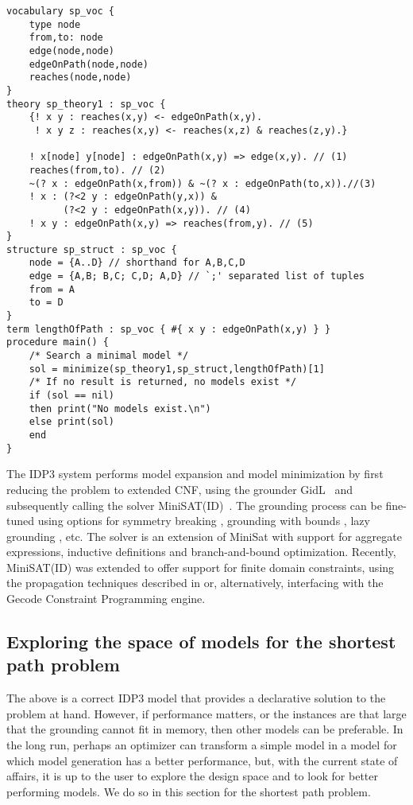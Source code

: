 \documentclass{tlp}
\newcommand{\idpdrie}{{\sc IDP3}\xspace}
\newcommand{\minisatid}{{\sc MiniSAT(ID)}\xspace}
\newcommand{\gidl}{{\sc GidL}\xspace}
\renewcommand{\|}{\ensuremath{\,|\,}}
\renewcommand{\|}{\,|\,}
\begin{document}
\begin{lstlisting}[caption={Calling main() solves the shortest path problem for the given data.},label={shortestpath}]
vocabulary sp_voc {
    type node
    from,to: node
    edge(node,node)
    edgeOnPath(node,node)
    reaches(node,node)
}
theory sp_theory1 : sp_voc {
    {! x y : reaches(x,y) <- edgeOnPath(x,y).
     ! x y z : reaches(x,y) <- reaches(x,z) & reaches(z,y).}

    ! x[node] y[node] : edgeOnPath(x,y) => edge(x,y). // (1)
    reaches(from,to). // (2)
    ~(? x : edgeOnPath(x,from)) & ~(? x : edgeOnPath(to,x)).//(3)
    ! x : (?<2 y : edgeOnPath(y,x)) &
          (?<2 y : edgeOnPath(x,y)). // (4)
    ! x y : edgeOnPath(x,y) => reaches(from,y). // (5)
}
structure sp_struct : sp_voc {
    node = {A..D} // shorthand for A,B,C,D
    edge = {A,B; B,C; C,D; A,D} // `;' separated list of tuples
    from = A
    to = D
}
term lengthOfPath : sp_voc { #{ x y : edgeOnPath(x,y) } }
procedure main() {
    /* Search a minimal model */
    sol = minimize(sp_theory1,sp_struct,lengthOfPath)[1]
    /* If no result is returned, no models exist */
    if (sol == nil)
    then print("No models exist.\n")
    else print(sol)
    end
}
\end{lstlisting}


The \idpdrie system performs model expansion and model minimization by
first reducing the problem to extended CNF, using the grounder
\gidl~\cite{jair/WittocxMD10} and subsequently calling the solver
\minisatid~\cite{sat/MarienWDB08}. The grounding process can be
fine-tuned using options for symmetry
breaking \cite{ictai/DevriendtBMDD12}, grounding with bounds
\cite{jair/WittocxMD10}, lazy grounding \cite{iclp/DeCatDS12},
etc. The solver is an extension of MiniSat \cite{sat/EenS03} with
support for aggregate expressions, inductive definitions and
branch-and-bound optimization. Recently, \minisatid was extended to
offer support for finite domain constraints, using the propagation
techniques described in \cite{toplas/SchulteS08} or, alternatively,
interfacing with the {\sc Gecode} Constraint Programming engine.


\subsection{Exploring the space of  models for the shortest path problem}\label{sec:user}

% 
The above is a correct \idpdrie model that provides a declarative
solution to the problem at hand.
%
However, if performance matters, or the instances
are that large that the grounding cannot fit in memory, then other
models can be preferable. In the long run, perhaps an optimizer can
transform a simple model in a model for which model generation has a
better performance, but, with the current state of affairs, it is up
to the user to explore the design space and to look for better
performing models. We do so in this section for the shortest path
problem.
\end{document}
